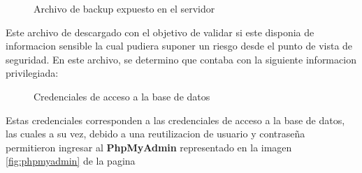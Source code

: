 \documentclass[a4paper]{article} %
\begin{document}
  \begin{figure}[h]

    \centering
    \setlength{\fboxrule}{0.8pt}
      \caption{Archivo de backup expuesto en el servidor}
      \label{fig:backup}
  \end{figure}

  \clearpage

  Este archivo de descargado con el objetivo de validar si este disponia de informacion sensible la cual pudiera suponer un riesgo desde el punto de vista de seguridad. En este archivo, se determino que contaba con la siguiente informacion privilegiada:

  \begin{figure}[h]

    \centering
    \setlength{\fboxrule}{0.8pt}
      \caption{Credenciales de acceso a la base de datos}
      \label{fig:credentials}
  \end{figure}

  Estas credenciales corresponden a las credenciales de acceso a la base de datos, las cuales a su vez, debido a una reutilizacion de usuario y contraseña permitieron ingresar al \textbf{PhpMyAdmin} representado en la imagen \ref{fig:phpmyadmin} de la pagina \pageref{fig:phpmyadmin}

  \vspace{0.3cm}
\end{document}
